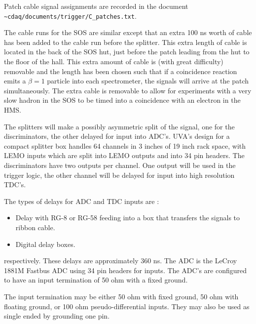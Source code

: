 Patch cable signal assignments are recorded in the document
\verb|~cdaq/documents/trigger/C_patches.txt|.

The cable runs for the SOS are similar except that an extra 100 ns worth
of cable has been added to the cable run before the splitter.  This extra length
of cable is located in the back of the SOS hut, just before the patch leading
from the hut to the floor of the hall. This  extra amount of cable is (with
great difficulty)
removable and the length has been chosen such that if a coincidence reaction
emits a $\beta = 1$ particle into each spectrometer, the signals will arrive
at the patch simultaneously.  The extra cable is removable to allow for
experiments with a very slow hadron in the SOS to be timed into a
coincidence with an electron in the HMS.

The splitters will make a possibly asymmetric split of the signal, one for the
discriminators, the other delayed for input into ADC's. UVA's design for a
compact splitter box handles 64 channels in 3 inches of 19 inch rack space,
with LEMO inputs which are split into LEMO outputs and into 34 pin headers.
The discriminators have two outputs per channel. One output will be used in
the trigger logic, the other channel will be delayed for input into high
resolution TDC's.

The types of delays for ADC and TDC inputs are :
\begin{itemize}
\item Delay with RG-8 or RG-58 feeding into a box that transfers the
signals to ribbon cable.
\item Digital delay boxes.
\end{itemize}
respectively. These delays are approximately 360 ns. The ADC is
the LeCroy 1881M Fastbus ADC using 34 pin headers for inputs.
The ADC's are configured to have an input termination of 50 ohm with a
fixed ground.

The input termination may be either 50 ohm with fixed ground,
50 ohm with floating ground, or  100 ohm pseudo-differential inputs.
They may also be used as single ended by grounding one pin.



